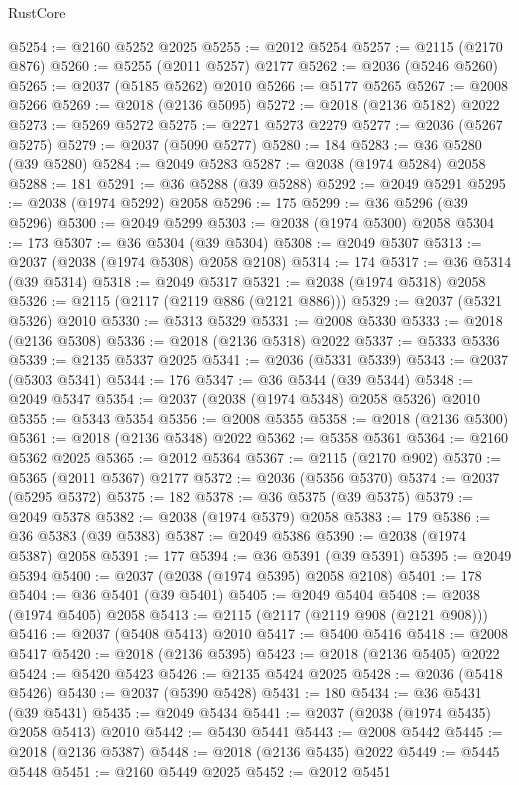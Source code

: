 \begin{lexlean}{RustCore}
\begin{coremodule}
@5254 := @2160 @5252 @2025
@5255 := @2012 @5254
@5257 := @2115 (@2170 @876)
@5260 := @5255 (@2011 @5257) @2177
@5262 := @2036 (@5246 @5260)
@5265 := @2037 (@5185 @5262) @2010
@5266 := @5177 @5265
@5267 := @2008 @5266
@5269 := @2018 (@2136 @5095)
@5272 := @2018 (@2136 @5182) @2022
@5273 := @5269 @5272
@5275 := @2271 @5273 @2279
@5277 := @2036 (@5267 @5275)
@5279 := @2037 (@5090 @5277)
@5280 := 184
@5283 := @36 @5280 (@39 @5280)
@5284 := @2049 @5283
@5287 := @2038 (@1974 @5284) @2058
@5288 := 181
@5291 := @36 @5288 (@39 @5288)
@5292 := @2049 @5291
@5295 := @2038 (@1974 @5292) @2058
@5296 := 175
@5299 := @36 @5296 (@39 @5296)
@5300 := @2049 @5299
@5303 := @2038 (@1974 @5300) @2058
@5304 := 173
@5307 := @36 @5304 (@39 @5304)
@5308 := @2049 @5307
@5313 := @2037 (@2038 (@1974 @5308) @2058 @2108)
@5314 := 174
@5317 := @36 @5314 (@39 @5314)
@5318 := @2049 @5317
@5321 := @2038 (@1974 @5318) @2058
@5326 := @2115 (@2117 (@2119 @886 (@2121 @886)))
@5329 := @2037 (@5321 @5326) @2010
@5330 := @5313 @5329
@5331 := @2008 @5330
@5333 := @2018 (@2136 @5308)
@5336 := @2018 (@2136 @5318) @2022
@5337 := @5333 @5336
@5339 := @2135 @5337 @2025
@5341 := @2036 (@5331 @5339)
@5343 := @2037 (@5303 @5341)
@5344 := 176
@5347 := @36 @5344 (@39 @5344)
@5348 := @2049 @5347
@5354 := @2037 (@2038 (@1974 @5348) @2058 @5326) @2010
@5355 := @5343 @5354
@5356 := @2008 @5355
@5358 := @2018 (@2136 @5300)
@5361 := @2018 (@2136 @5348) @2022
@5362 := @5358 @5361
@5364 := @2160 @5362 @2025
@5365 := @2012 @5364
@5367 := @2115 (@2170 @902)
@5370 := @5365 (@2011 @5367) @2177
@5372 := @2036 (@5356 @5370)
@5374 := @2037 (@5295 @5372)
@5375 := 182
@5378 := @36 @5375 (@39 @5375)
@5379 := @2049 @5378
@5382 := @2038 (@1974 @5379) @2058
@5383 := 179
@5386 := @36 @5383 (@39 @5383)
@5387 := @2049 @5386
@5390 := @2038 (@1974 @5387) @2058
@5391 := 177
@5394 := @36 @5391 (@39 @5391)
@5395 := @2049 @5394
@5400 := @2037 (@2038 (@1974 @5395) @2058 @2108)
@5401 := 178
@5404 := @36 @5401 (@39 @5401)
@5405 := @2049 @5404
@5408 := @2038 (@1974 @5405) @2058
@5413 := @2115 (@2117 (@2119 @908 (@2121 @908)))
@5416 := @2037 (@5408 @5413) @2010
@5417 := @5400 @5416
@5418 := @2008 @5417
@5420 := @2018 (@2136 @5395)
@5423 := @2018 (@2136 @5405) @2022
@5424 := @5420 @5423
@5426 := @2135 @5424 @2025
@5428 := @2036 (@5418 @5426)
@5430 := @2037 (@5390 @5428)
@5431 := 180
@5434 := @36 @5431 (@39 @5431)
@5435 := @2049 @5434
@5441 := @2037 (@2038 (@1974 @5435) @2058 @5413) @2010
@5442 := @5430 @5441
@5443 := @2008 @5442
@5445 := @2018 (@2136 @5387)
@5448 := @2018 (@2136 @5435) @2022
@5449 := @5445 @5448
@5451 := @2160 @5449 @2025
@5452 := @2012 @5451

\end{coremodule}
\end{lexlean}
